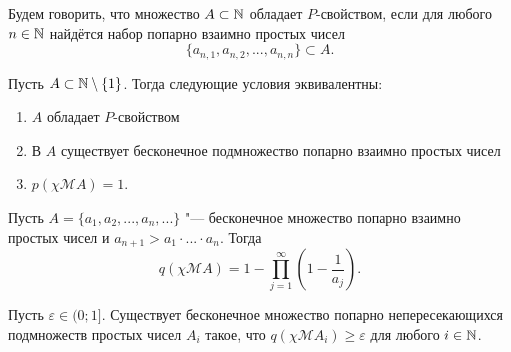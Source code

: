 	Будем говорить, что множество $A\subset\mathbb{N}$ обладает $P$-свойством,
	если для любого $n\in\mathbb{N}$ найдётся набор попарно взаимно простых чисел
	\begin{equation}
		\{a_{n,1}, a_{n,2}, ..., a_{n,n}  \} \subset A
		.
	\end{equation}

	Пусть $A\subset \mathbb{N}\setminus\{1\}$.
	Тогда следующие условия эквивалентны:
	\begin{enumerate}[label=(\roman*)]
		\item
			$A$ обладает $P$-свойством
		\item
			В $A$ существует бесконечное подмножество попарно взаимно простых чисел
		\item
			$p(\chi\mathscr{M}A)=1$.
	\end{enumerate}

	Пусть $A = \{a_1, a_2, ..., a_n,...\}$ "--- бесконечное множество попарно взаимно простых чисел
	и $a_{n+1}>a_1\cdot...\cdot a_n$.
	Тогда
	\begin{equation}
		q(\chi\mathscr{M}A) = 1-\prod_{j=1}^\infty \left(1-\frac{1}{a_j}\right)
		.
	\end{equation}

	Пусть $\varepsilon \in  (0; 1{]}$.
	Существует бесконечное множество попарно непересекающихся подмножеств простых чисел
	$A_i$ такое, что $q(\chi\mathscr{M}A_i)\geq\varepsilon$ для любого $i\in\mathbb{N}$.
